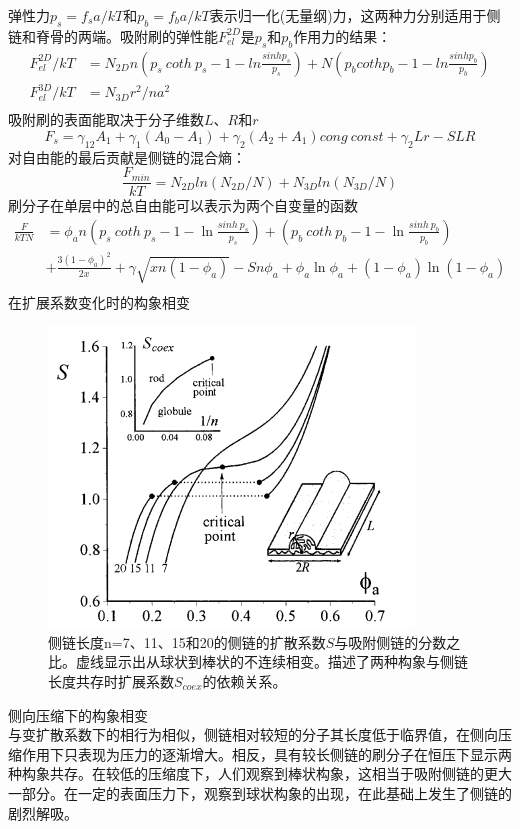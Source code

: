 \documentclass[12pt,a4paper]{article}
\numberwithin{equation}{section}
\begin{document}
弹性力$p_s=f_sa/kT$和$p_b=f_ba/kT$表示归一化(无量纲)力，这两种力分别适用于侧链和脊骨的两端。吸附刷的弹性能$F_{el}^{2D}$是$p_s$和$p_b$作用力的结果：
\begin{equation}
\begin{aligned}
F_{el}^{2D}/kT & =N_{2D}n\left( p_s~coth~p_s-1-ln\frac{sinh p_s}{p_s} \right)	+N \left( p_b coth p_b-1-ln\frac{sinh p_b}{p_b} \right)\\
F_{el}^{3D}/kT & = N_{3D}r^2/na^2\\
\end{aligned}
\end{equation}
吸附刷的表面能取决于分子维数$L$、$R$和$r$
\begin{equation}
F_{s}=\gamma _{12}A_1+\gamma _1(A_0-A_1)+\gamma _2(A_2+A_1)cong ~const + \gamma_2Lr-SLR
\end{equation}
对自由能的最后贡献是侧链的混合熵：
\begin{equation}
\frac{F_{min}}{kT}=N_{2D}ln (N_{2D}/N)+N_{3D}ln(N_{3D}/N)
\end{equation}	
刷分子在单层中的总自由能可以表示为两个自变量的函数
\begin{equation}
\begin{aligned}
\frac{F}{kTN} & = \phi _an\left( p_s~coth~p_s-1-\ln\frac{sinh~p_s}{p_s} \right)+\left( p_b~coth~p_b-1-\ln\frac{sinh~p_b}{p_b} \right)\\
& +\frac{3(1-\phi_a)^2}{2x}+\gamma \sqrt{xn(1-\phi_a)}-Sn\phi_a+\phi_a\ln\phi_a+(1-\phi_a)\ln(1-\phi_a)\\
\end{aligned}
\end{equation}	
在扩展系数变化时的构象相变
\begin{figure}[H]
\centering
\includegraphics[scale=0.5]{./figures/11.png}
\caption{侧链长度n=7、11、15和20的侧链的扩散系数$S$与吸附侧链的分数之比。虚线显示出从球状到棒状的不连续相变。描述了两种构象与侧链长度共存时扩展系数$S_{coex}$的依赖关系。}
\end{figure}
侧向压缩下的构象相变\\
与变扩散系数下的相行为相似，侧链相对较短的分子其长度低于临界值，在侧向压缩作用下只表现为压力的逐渐增大。相反，具有较长侧链的刷分子在恒压下显示两种构象共存。在较低的压缩度下，人们观察到棒状构象，这相当于吸附侧链的更大一部分。在一定的表面压力下，观察到球状构象的出现，在此基础上发生了侧链的剧烈解吸。
\end{document}
